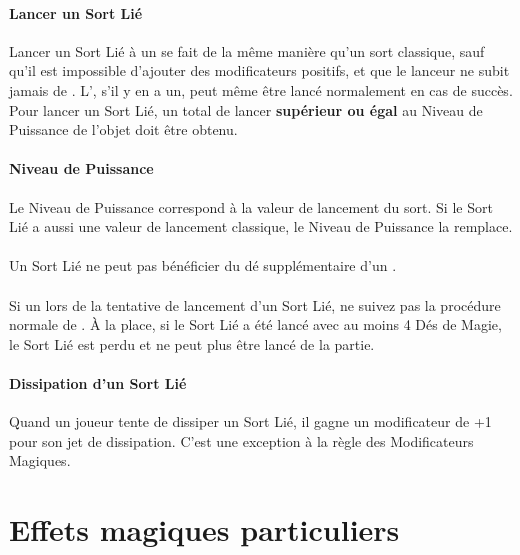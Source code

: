 \paragraph{Lancer un Sort Lié}

Lancer un Sort Lié à un \boundspell{} se fait de la même manière qu'un sort classique, sauf qu'il est impossible d'ajouter des modificateurs positifs, et que le lanceur ne subit jamais de \lostfocus{}. L'\attributespell{}, s'il y en a un, peut même être lancé normalement en cas de succès. Pour lancer un Sort Lié, un total de lancer \textbf{supérieur ou égal} au Niveau de Puissance de l'objet doit être obtenu.

\paragraph{Niveau de Puissance}

Le Niveau de Puissance correspond à la valeur de lancement du sort. Si le Sort Lié a aussi une valeur de lancement classique, le Niveau de Puissance la remplace.

\paragraph{\overwhelmingpower}

Un Sort Lié ne peut pas bénéficier du dé supplémentaire d'un \overwhelmingpower{}.

\paragraph{\miscast}

Si un \overwhelmingpower{} lors de la tentative de lancement d'un Sort Lié, ne suivez pas la procédure normale de \miscast{}. À la place, si le Sort Lié a été lancé avec au moins 4 Dés de Magie, le Sort Lié est perdu et ne peut plus être lancé de la partie.

\paragraph{Dissipation d'un Sort Lié}

Quand un joueur tente de dissiper un Sort Lié, il gagne un modificateur de +1 pour son jet de dissipation. C'est une exception à la règle des Modificateurs Magiques.

\newpage
\section{Effets magiques particuliers}

